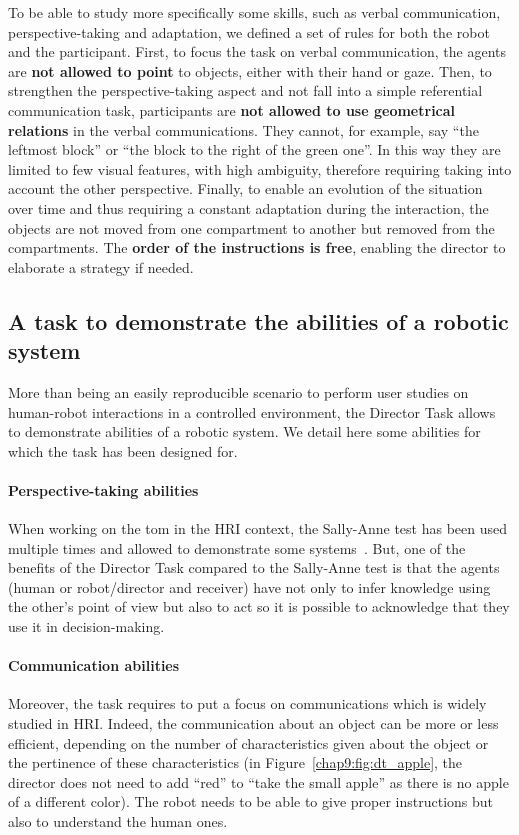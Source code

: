\documentclass[a4paper,11pt,twoside]{StyleThese}
\begin{document}
To be able to study more specifically some skills, such as verbal communication, perspective-taking and adaptation, we defined a set of rules for both the robot and the participant. First, to focus the task on verbal communication, the agents are \textbf{not allowed to point} to objects, either with their hand or gaze. Then, to strengthen the perspective-taking aspect and not fall into a simple referential communication task, participants are \textbf{not allowed to use geometrical relations} in the verbal communications. They cannot, for example, say ``the leftmost block'' or ``the block to the right of the green one''. In this way they are limited to few visual features, with high ambiguity, therefore requiring taking into account the other perspective. Finally, to enable an evolution of the situation over time and thus requiring a constant adaptation during the interaction, the objects are not moved from one compartment to another but removed from the compartments. The \textbf{order of the instructions is free}, enabling the director to elaborate a strategy if needed.

\subsection{A task to demonstrate the abilities of a robotic system}\label{subsec:abilities}

More than being an easily reproducible scenario to perform user studies on human-robot interactions in a controlled environment, the Director Task allows to demonstrate abilities of a robotic system. We detail here some abilities for which the task has been designed for.

\paragraph{Perspective-taking abilities} When working on the \acrshort{tom} in the HRI context, the Sally-Anne test has been used multiple times and allowed to demonstrate some systems~\citep{milliez_2014_framework}. But, one of the benefits of the Director Task compared to the Sally-Anne test is that the agents (human or robot/director and receiver) have not only to infer knowledge using the other's point of view but also to act so it is possible to acknowledge that they use it in decision-making. 

\paragraph{Communication abilities} Moreover, the task 
requires to put a focus on communications which is widely studied in HRI. Indeed, the communication about an object can be more or less efficient, depending on the number of characteristics given about the object or the pertinence of these characteristics (\eg in Figure~\ref{chap9:fig:dt_apple}, the director does not need to add ``red'' to ``take the small apple'' as there is no apple of a different color). The robot needs to be able to give proper instructions but also to understand the human ones.
\end{document}
